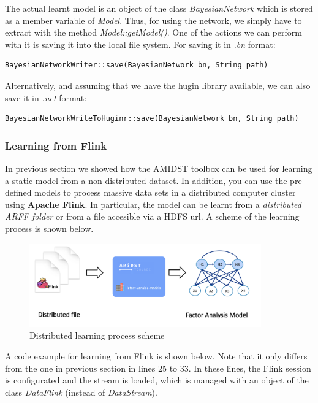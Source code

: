 \documentclass[10pt,a4paper]{article}
\begin{document}
The actual learnt model is an object of the class \textit{BayesianNetwork} which is stored as a member variable of \textit{Model}. Thus, for using the network, we simply have to extract with the method \textit{Model::getModel()}. One of the actions we can perform with it is saving it into the local file system. For saving it in \textit{.bn} format:

\begin{verbatim}
BayesianNetworkWriter::save(BayesianNetwork bn, String path)
\end{verbatim}

\noindent Alternatively, and assuming that we have the hugin library available, we can also save it in \textit{.net} format:

\begin{verbatim}
BayesianNetworkWriteToHuginr::save(BayesianNetwork bn, String path)
\end{verbatim}



\subsubsection{Learning from Flink}\label{sec:lvmodels:static:flinklearning}

In previous section we showed how the AMIDST toolbox can be used for learning a static model from a non-distributed dataset. In addition, you can use the pre-defined models to process massive data sets in a distributed computer cluster using \textbf{Apache Flink}. In particular, the model can be learnt from a \textit{distributed ARFF folder} or from a file  accesible via a HDFS url. A scheme of the learning process is shown below.




\begin{figure}[h!]
	\centering
	\includegraphics[width=10cm]{img/distributedlearning.png}
	\caption{Distributed learning process scheme}
	\label{fig:lvmodels:static:flinklearning:scheme}	
\end{figure}

A code example for learning from Flink is shown below. Note that it only differs from the one in previous section in lines 25 to 33. In these lines, the Flink session is configurated and the stream is loaded, which is managed with an object of the class \textit{DataFlink} (instead of \textit{DataStream}). 
\end{document}
